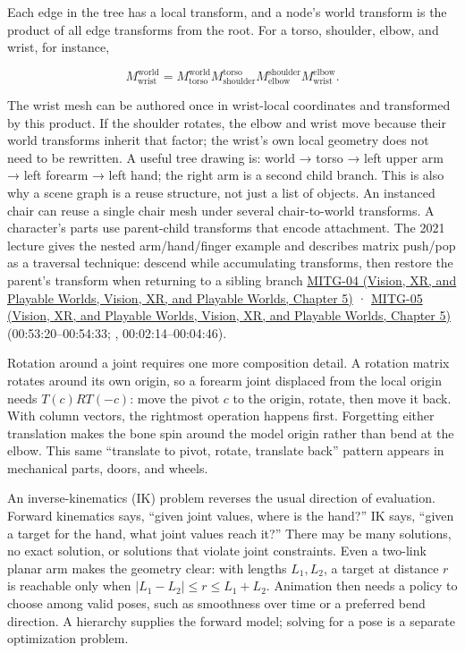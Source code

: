 Each edge in the tree has a local transform, and a node's world transform is the product of all edge transforms from the root. For a torso, shoulder, elbow, and wrist, for instance,

\[
M_{\mathrm{wrist}}^{\mathrm{world}}=
M_{\mathrm{torso}}^{\mathrm{world}}
M_{\mathrm{shoulder}}^{\mathrm{torso}}
M_{\mathrm{elbow}}^{\mathrm{shoulder}}
M_{\mathrm{wrist}}^{\mathrm{elbow}}.
\]

The wrist mesh can be authored once in wrist-local coordinates and transformed by this product. If the shoulder rotates, the elbow and wrist move because their world transforms inherit that factor; the wrist's own local geometry does not need to be rewritten. A useful tree drawing is: world → torso → left upper arm → left forearm → left hand; the right arm is a second child branch. This is also why a scene graph is a reuse structure, not just a list of objects. An instanced chair can reuse a single chair mesh under several chair-to-world transforms. A character's parts use parent-child transforms that encode attachment. The 2021 lecture gives the nested arm/hand/finger example and describes matrix push/pop as a traversal technique: descend while accumulating transforms, then restore the parent's transform when returning to a sibling branch \href{../07-Vision-XR-and-Playable-Worlds/main.pdf\#nameddest=04-visual-computing-ii-ch036-mitg-04---transformations}{MITG-04 (Vision, XR, and Playable Worlds, Vision, XR, and Playable Worlds, Chapter 5)} · \href{../07-Vision-XR-and-Playable-Worlds/main.pdf\#nameddest=04-visual-computing-ii-ch036-mitg-05---hierarchical-modeling}{MITG-05 (Vision, XR, and Playable Worlds, Vision, XR, and Playable Worlds, Chapter 5)} (00:53:20--00:54:33; , 00:02:14--00:04:46).

Rotation around a joint requires one more composition detail. A rotation matrix rotates around its own origin, so a forearm joint displaced from the local origin needs \(T(c)RT(-c)\): move the pivot \(c\) to the origin, rotate, then move it back. With column vectors, the rightmost operation happens first. Forgetting either translation makes the bone spin around the model origin rather than bend at the elbow. This same ``translate to pivot, rotate, translate back'' pattern appears in mechanical parts, doors, and wheels.

An inverse-kinematics (IK) problem reverses the usual direction of evaluation. Forward kinematics says, ``given joint values, where is the hand?'' IK says, ``given a target for the hand, what joint values reach it?'' There may be many solutions, no exact solution, or solutions that violate joint constraints. Even a two-link planar arm makes the geometry clear: with lengths \(L_1,L_2\), a target at distance \(r\) is reachable only when \(|L_1-L_2|\le r\le L_1+L_2\). Animation then needs a policy to choose among valid poses, such as smoothness over time or a preferred bend direction. A hierarchy supplies the forward model; solving for a pose is a separate optimization problem.


